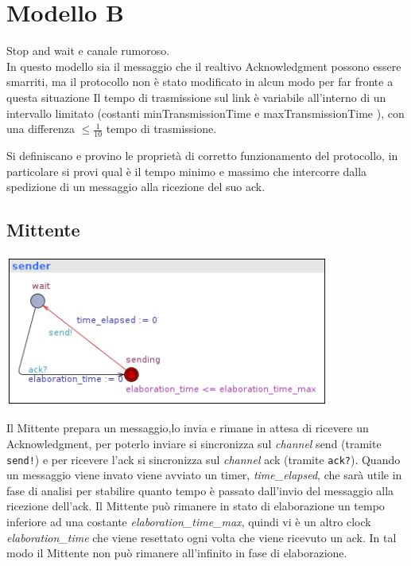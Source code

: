 \documentclass[a4paper]{article}
\newcommand{\channel}{\textit{channel }}
\begin{document}
\section{Modello B}
Stop and wait e canale rumoroso.\\ 
In questo modello sia il messaggio che il realtivo Acknowledgment possono essere smarriti, ma il protocollo non è stato modificato in alcun modo per far fronte a questa situazione
Il tempo di trasmissione sul link è variabile all’interno di un intervallo limitato (costanti minTransmissionTime e maxTransmissionTime ), con una differenza $\leq \frac{1}{10}$ tempo di trasmissione. 

Si definiscano e provino le proprietà di corretto funzionamento del protocollo, in particolare si provi qual è il tempo minimo e massimo che intercorre dalla spedizione di un messaggio alla ricezione del suo ack.
\subsection{Mittente}
\begin{center}\includegraphics[width=0.8\textwidth]{1_sender.png}\end{center}
Il Mittente prepara un messaggio,lo invia e rimane in attesa di ricevere un Acknowledgment, per poterlo inviare si sincronizza sul \channel send (tramite \texttt{send!}) e per ricevere l'ack si sincronizza sul \channel ack (tramite \texttt{ack?}).
Quando un messaggio viene invato viene avviato un timer, \textit{time\_elapsed}, che sarà utile in fase di analisi per stabilire quanto tempo è passato dall'invio del messaggio alla ricezione dell'ack.
Il Mittente può rimanere in stato di elaborazione un tempo inferiore ad una costante \textit{elaboration\_time\_max}, quindi vi è un altro clock \textit{elaboration\_time} che viene resettato ogni volta che viene ricevuto un ack.
In tal modo il Mittente non può rimanere all'infinito in fase di elaborazione.
\end{document}

